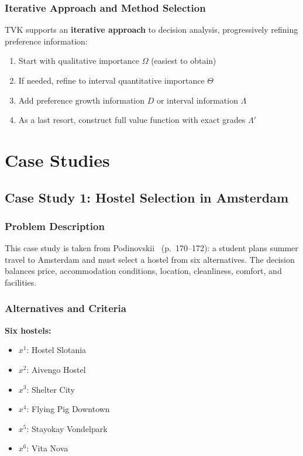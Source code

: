 \documentclass[conference]{IEEEtran}
\begin{document}
\subsubsection{Iterative Approach and Method Selection}

TVK supports an \textbf{iterative approach} to decision analysis, progressively refining preference information:

\begin{enumerate}
	\item Start with qualitative importance $\Omega$ (easiest to obtain)
	\item If needed, refine to interval quantitative importance $\Theta$
	\item Add preference growth information $D$ or interval information $\Lambda$
	\item As a last resort, construct full value function with exact grades $\Lambda'$
\end{enumerate}

\section{Case Studies}

\subsection{Case Study 1: Hostel Selection in Amsterdam}

\subsubsection{Problem Description}

This case study is taken from Podinovskii~\cite{podinovskii2022mcdm} (p.~170--172): a student plans summer travel to Amsterdam and must select a hostel from six alternatives. The decision balances price, accommodation conditions, location, cleanliness, comfort, and facilities.

\subsubsection{Alternatives and Criteria}

\textbf{Six hostels:}
\begin{itemize}
	\item $x^1$: Hostel Slotania
	\item $x^2$: Aivengo Hostel
	\item $x^3$: Shelter City
	\item $x^4$: Flying Pig Downtown
	\item $x^5$: Stayokay Vondelpark
	\item $x^6$: Vita Nova
\end{itemize}
\end{document}
